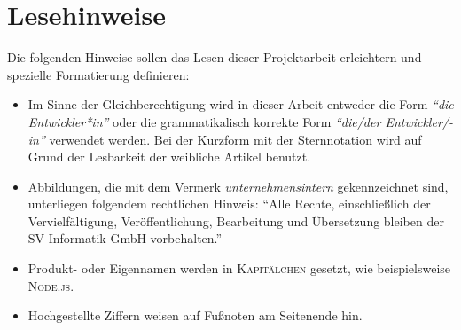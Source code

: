 \chapter*{Lesehinweise}
Die folgenden Hinweise sollen das Lesen dieser Projektarbeit erleichtern und spezielle Formatierung definieren:

\begin{itemize}
	\item Im Sinne der Gleichberechtigung wird in dieser Arbeit entweder die Form \textit{\enquote{die Entwickler*in}} oder die grammatikalisch korrekte Form \textit{\enquote{die/der Entwickler/-in}} verwendet werden. Bei der Kurzform mit der Sternnotation wird auf Grund der Lesbarkeit der weibliche Artikel benutzt.
	\item Abbildungen, die mit dem Vermerk \textit{unternehmensintern} gekennzeichnet sind, unterliegen folgendem rechtlichen Hinweis: \enquote{Alle Rechte, einschließlich der Vervielfältigung, Veröffentlichung, Bearbeitung und Übersetzung bleiben der SV Informatik GmbH vorbehalten.}
	\item Produkt- oder Eigennamen werden in \textsc{Kapitälchen} gesetzt, wie beispielsweise \textsc{Node.js}.
	\item Hochgestellte Ziffern weisen auf Fußnoten am Seitenende hin.
	
	
\end{itemize}
 
